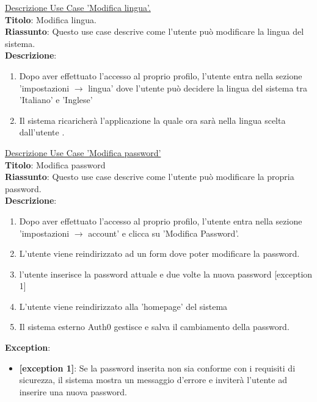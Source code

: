 \documentclass{article}
\begin{document}
    \noindent\underline{Descrizione Use Case 'Modifica lingua'.}\\
    \textbf{Titolo}: Modifica lingua.\\
    \textbf{Riassunto}: Questo use case descrive come l'utente può modificare la lingua del sistema.\\
    \textbf{Descrizione}: 
    \begin{enumerate}
        \item Dopo aver effettuato l'accesso al proprio profilo, l'utente entra nella sezione 'impostazioni $\rightarrow$ lingua' dove l'utente può decidere la lingua del sistema tra 'Italiano' e 'Inglese'
        \item Il sistema ricaricherà l'applicazione la quale ora sarà nella lingua scelta dall'utente .
    \end{enumerate}

    \noindent\underline{Descrizione Use Case 'Modifica password'}\\
    \textbf{Titolo}: Modifica password\\
    \textbf{Riassunto}: Questo use case descrive come l'utente può modificare la propria password.\\
    \textbf{Descrizione}: 
    \begin{enumerate}
        \item Dopo aver effettuato l'accesso al proprio profilo, l'utente entra nella sezione 'impostazioni $\rightarrow$ account' e clicca su 'Modifica Password'.
        \item L'utente viene reindirizzato ad un form dove poter modificare la password.
        \item l'utente inserisce la password attuale e due volte la nuova password [exception 1]
        \item L'utente viene reindirizzato alla 'homepage' del sistema
        \item Il sistema esterno Auth0 gestisce e salva il cambiamento della password.
    \end{enumerate}
        \textbf{Exception}: 
        \begin{itemize}
            \item \textbf{[exception 1]}: Se la password inserita non sia conforme con i requisiti di sicurezza, il sistema mostra un messaggio d'errore e inviterà l'utente ad inserire una nuova password.
        \end{itemize}
\end{document}
